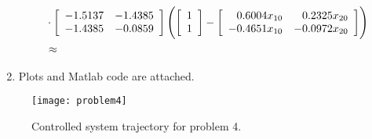 \documentclass{article}
\begin{document}
\begin{enumerate}
{\begin{align*}
      & \cdot
      \left[\begin{array}{r r}
       -1.5137 & -1.4385 \\
       -1.4385 & -0.0859
      \end{array}\right]
      \left(
        \left[\begin{array}{c}
          1 \\ 1
        \end{array}\right]
      - \left[\begin{array}{r r}
          0.6004 x_{10} &  0.2325 x_{20} \\
         -0.4651 x_{10} & -0.0972 x_{20}
        \end{array}\right]
      \right) \\
      & \approx
    \end{align*}
  }
  \item{
    Plots and Matlab code are attached.
  }
\end{enumerate}

\begin{figure}[h!]
  \texttt{[image: problem4]}
  \caption{Controlled system trajectory for problem 4.}
\end{figure}
\end{document}

